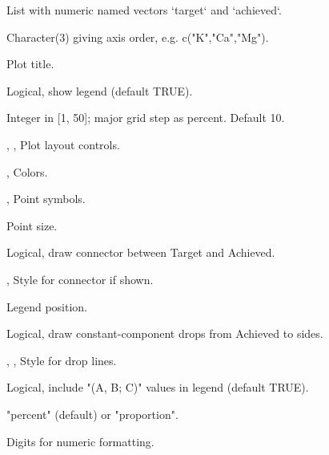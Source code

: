 \documentclass[a4paper]{book}
\begin{document}
\begin{Arguments}
\begin{ldescription}
\item[\code{result}] List with numeric named vectors `target` and `achieved`.

\item[\code{keys}] Character(3) giving axis order, e.g. c("K","Ca","Mg").

\item[\code{title}] Plot title.

\item[\code{show\_legend}] Logical, show legend (default TRUE).

\item[\code{step\_percent}] Integer in [1, 50]; major grid step as percent. Default 10.

\item[\code{lab\_cex}, \code{axis\_cex}, \code{padding}] Plot layout controls.

\item[\code{col\_target}, \code{col\_achieved}] Colors.

\item[\code{pch\_target}, \code{pch\_achieved}] Point symbols.

\item[\code{cex\_points}] Point size.

\item[\code{show\_link}] Logical, draw connector between Target and Achieved.

\item[\code{lty\_link}, \code{lwd\_link}] Style for connector if shown.

\item[\code{legend\_pos}] Legend position.

\item[\code{show\_axis\_drops}] Logical, draw constant-component drops from Achieved to sides.

\item[\code{drop\_col}, \code{drop\_lwd}, \code{drop\_lty}] Style for drop lines.

\item[\code{show\_ratio}] Logical, include "(A, B; C)" values in legend (default TRUE).

\item[\code{ratio\_format}] "percent" (default) or "proportion".

\item[\code{ratio\_digits}] Digits for numeric formatting.
\end{ldescription}
\end{Arguments}
\end{document}
